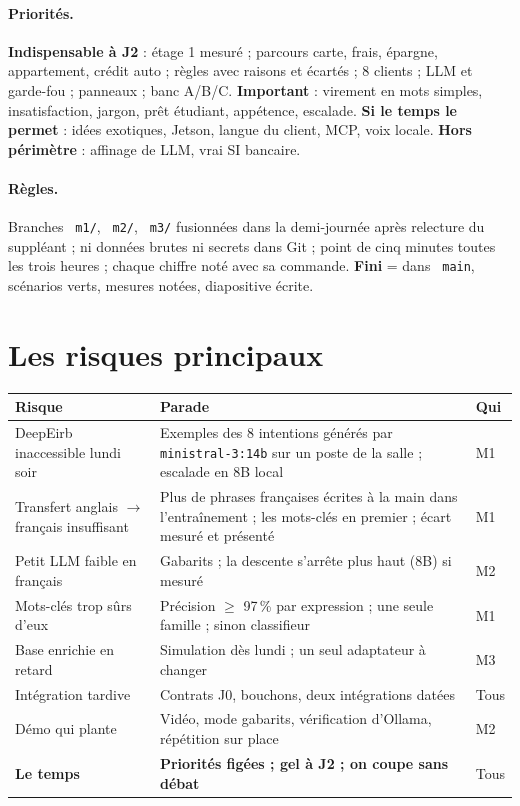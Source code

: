 \documentclass[11pt,a4paper]{article}
\DeclareRobustCommand{\f}[1]{{\texttt{\small
  \renewcommand{\_}{\char`\_\allowbreak}#1}}}
\begin{document}
\paragraph{Priorités.} \textbf{Indispensable à J2} : étage 1 mesuré ; parcours carte, frais,
épargne, appartement, crédit auto ; règles avec raisons et écartés ; 8 clients ; LLM et garde-fou ;
panneaux ; banc A/B/C. \textbf{Important} : virement en mots simples, insatisfaction, jargon, prêt
étudiant, appétence, escalade. \textbf{Si le temps le permet} : idées exotiques, Jetson, langue du
client, MCP, voix locale. \textbf{Hors périmètre} : affinage de LLM, vrai SI bancaire.

\paragraph{Règles.} Branches \f{m1/}, \f{m2/}, \f{m3/} fusionnées dans la demi-journée après relecture
du suppléant ; ni données brutes ni secrets dans Git ; point de cinq minutes toutes les trois heures ;
chaque chiffre noté avec sa commande. \textbf{\og Fini \fg} = dans \f{main}, scénarios verts,
mesures notées, diapositive écrite.

\section{Les risques principaux}

\begin{center}\small
\begin{tabularx}{\textwidth}{@{}L{4.6cm} Y l@{}}
\toprule
\textbf{Risque} & \textbf{Parade} & \textbf{Qui} \\
\midrule
DeepEirb inaccessible lundi soir & Exemples des 8 intentions générés par \f{ministral-3:14b} sur un
  poste de la salle ; escalade en 8B local & M1 \\
Transfert anglais $\to$ français insuffisant & Plus de phrases françaises écrites à la main dans
  l'entraînement ; les mots-clés en premier ; écart mesuré et présenté & M1 \\
Petit LLM faible en français & Gabarits ; la descente s'arrête plus haut (8B) si mesuré & M2 \\
Mots-clés trop sûrs d'eux & Précision $\geq$ 97\,\% par expression ; une seule famille ; sinon
  classifieur & M1 \\
Base enrichie en retard & Simulation dès lundi ; un seul adaptateur à changer & M3 \\
Intégration tardive & Contrats J0, bouchons, deux intégrations datées & Tous \\
Démo qui plante & Vidéo, mode gabarits, vérification d'Ollama, répétition sur place & M2 \\
\textbf{Le temps} & \textbf{Priorités figées ; gel à J2 ; on coupe sans débat} & Tous \\
\bottomrule
\end{tabularx}
\end{center}
\end{document}
